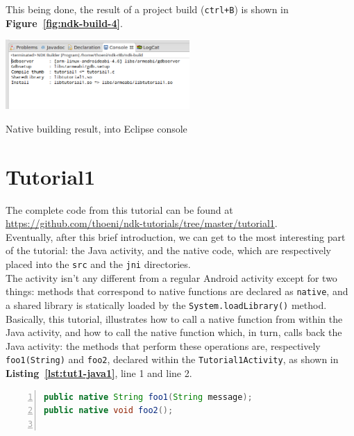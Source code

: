 \documentclass[a4paper,10pt]{article}
\makeatletter
\newenvironment{figurehere}{\def\@captype{figure}\vspace{2ex}}{\vspace{2ex}}
\newcommand{\keyword}[1]{\texttt{#1}}
\newcommand{\reff}[1]{\textbf{Figure~\ref{#1}}}
\newcommand{\refl}[1]{\textbf{Listing~\ref{#1}}}
\makeatother
\begin{document}
\begin{multicols}{2}
This being done, the result of a project build (\texttt{ctrl+B}) is shown in
\reff{fig:ndk-build-4}.

\begin{figurehere}
 \centering
 \includegraphics[width=7cm]{./figures/ndk-build-4.png}
 \caption{Native building result, into Eclipse console}
 \label{fig:ndk-build-4}
\end{figurehere}


\section{Tutorial1}
\label{sec:tutorial1}
The complete code from this tutorial can be found at 
\url{https://github.com/thoeni/ndk-tutorials/tree/master/tutorial1}.\\
Eventually, after this brief introduction, we can get to the most interesting
part of the tutorial: the Java activity, and the native code, which are 
respectively placed into the \keyword{src} and the \keyword{jni} directories.\\
The activity isn't any different from a regular Android activity except for two
things: methods that correspond to native functions are declared as
\keyword{native}, and a shared library is statically loaded by the
\keyword{System.loadLibrary()} method.\\
Basically, this tutorial, illustrates how to call a native function from within
the Java activity, and how to call the native function which, in turn, calls
back the Java activity: the methods that perform these operations are,
respectively \keyword{foo1(String)} and \keyword{foo2}, declared within the
\keyword{Tutorial1Activity}, as shown in \refl{lst:tut1-java1}, line 1 and line
2.

\begin{lstlisting}[language=Java,
		   columns=fullflexible,
		   showstringspaces=false,
		   xleftmargin=15pt,
		   frame = l,
		   numbers=left,
		   commentstyle=\color{gray}\upshape,
		   caption=Part of Tutorial1Activity.java,
		   label=lst:tut1-java1]
public native String foo1(String message);
public native void foo2();
  

\end{lstlisting}
\end{multicols}
\end{document}

